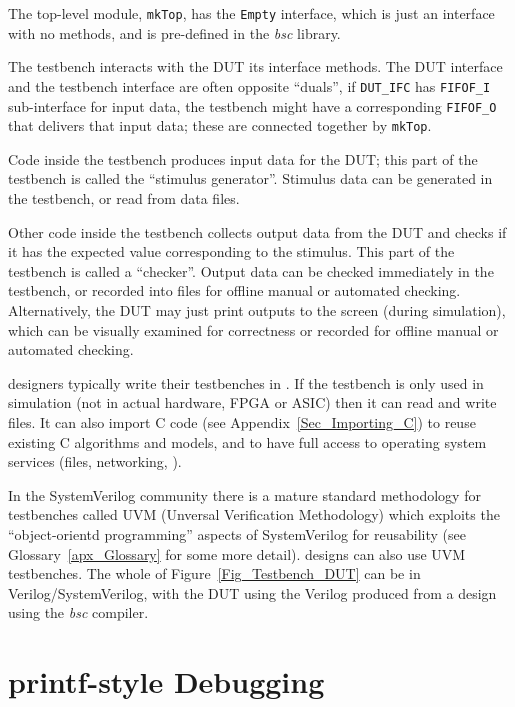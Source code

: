 The top-level module, \verb|mkTop|, has the \verb|Empty| interface,
which is just an interface with no methods, and is pre-defined in the
\emph{bsc} library.

The testbench interacts with the DUT {\via} its interface methods.
The DUT interface and the testbench interface are often opposite
``duals'', {\eg} if \verb|DUT_IFC| has \verb|FIFOF_I| sub-interface
for input data, the testbench might have a corresponding
\verb|FIFOF_O| that delivers that input data; these are connected
together by \verb|mkTop|.

Code inside the testbench produces input data for the DUT; this part
of the testbench is called the ``stimulus generator''.  Stimulus data
can be generated in the testbench, or read from data files.

Other code inside the testbench collects output data from the DUT and
checks if it has the expected value corresponding to the stimulus.
This part of the testbench is called a ``checker''.  Output data can
be checked immediately in the testbench, or recorded into files for
offline manual or automated checking.  Alternatively, the DUT may just
print outputs to the screen (during simulation), which can be visually
examined for correctness or recorded for offline manual or automated
checking.

{\BSV} designers typically write their testbenches in {\BSV}.  If the
testbench is only used in simulation (not in actual hardware, FPGA or
ASIC) then it can read and write files.  It can also import C code
(see Appendix~\ref{Sec_Importing_C}) to reuse existing C algorithms
and models, and to have full access to operating system services
(files, networking, {\etc}).

In the SystemVerilog community there is a mature standard methodology
for testbenches called UVM (Unversal Verification Methodology) which
exploits the ``object-orientd programming'' aspects of SystemVerilog
for reusability (see Glossary~\ref{apx_Glossary} for some more
detail).  {\BSV} designs can also use UVM testbenches.  The whole of
Figure~\ref{Fig_Testbench_DUT} can be in Verilog/SystemVerilog, with
the DUT using the Verilog produced from a {\BSV} design using the
\emph{bsc} compiler.


\section{{\bf printf}-style Debugging}

